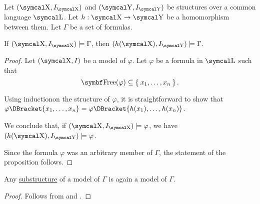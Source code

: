 \begin{proposition}\label{thm:first_order_homomorphism_preserves_models}
  Let \( (\CX, I_{\CX}) \) and \( (\CY, I_{\CY}) \) be structures over a common language \( \CL \). Let \( h: \CX \to \CY \) be a homomorphism between them. Let \( \Gamma \) be a set of formulas.

  If \( (\CX, I_{\CX}) \models \Gamma \), then \( (h(\CX), I_{\CY}) \models \Gamma \).
\end{proposition}
\begin{proof}
  Let \( (\CX, I) \) be a model of \( \varphi \). Let \( \varphi \) be a formula in \( \CL \) such that
  \begin{equation*}
    \Bold{Free}(\varphi) \subseteq \Set{x_1, \ldots, x_n}.
  \end{equation*}

  Using induction\IND on the structure of \( \varphi \), it is straightforward to show that \( \varphi\DBracket{x_1, \ldots, x_n} = \varphi\DBracket{h(x_1), \ldots, h(x_n)} \).

  We conclude that, if \( (\CX, I_{\CX}) \models \varphi \), we have \( (h(\CX), I_{\CY}) \models \varphi \).

  Since the formula \( \varphi \) was an arbitrary member of \( \Gamma \), the statement of the proposition follows.
\end{proof}

\begin{corollary}\label{thm:substructure_is_model}
  Any \hyperref[def:first_order_substructure]{substructure} of a model of \( \Gamma \) is again a model of \( \Gamma \).
\end{corollary}
\begin{proof}
  Follows from  and .
\end{proof}

\begin{remark}\label{rem:induction}
\end{remark}

\begin{definition}\label{def:first_order_model_category}
\end{definition}
